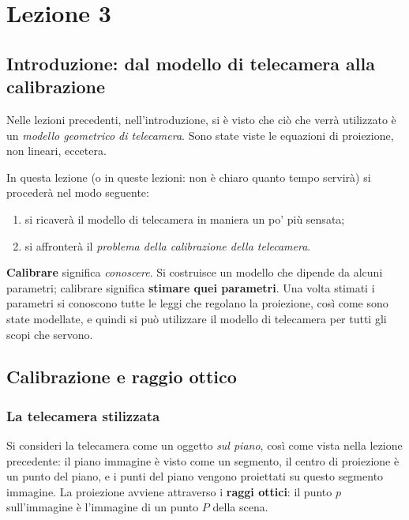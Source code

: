 
\chapter{Lezione 3}

\section{Introduzione: dal modello di telecamera alla calibrazione}

Nelle lezioni precedenti, nell'introduzione, si è visto che ciò che verrà utilizzato è un \emph{modello geometrico di telecamera}. Sono state viste le equazioni di proiezione, non lineari, eccetera.

In questa lezione (o in queste lezioni: non è chiaro quanto tempo servirà) si procederà nel modo seguente:
\begin{enumerate}[label=\arabic*.]
  \item si ricaverà il modello di telecamera in maniera un po' più sensata;
  \item si affronterà il \emph{problema della calibrazione della telecamera}.
\end{enumerate}

\textbf{Calibrare} significa \emph{conoscere}. Si costruisce un modello che dipende da alcuni parametri; calibrare significa \textbf{stimare quei parametri}. Una volta stimati i parametri si conoscono tutte le leggi che regolano la proiezione, così come sono state modellate, e quindi si può utilizzare il modello di telecamera per tutti gli scopi che servono.

\section{Calibrazione e raggio ottico}

\subsection{La telecamera stilizzata}

Si consideri la telecamera come un oggetto \emph{sul piano}, così come vista nella lezione precedente: il piano immagine è visto come un segmento, il centro di proiezione è un punto del piano, e i punti del piano vengono proiettati su questo segmento immagine. La proiezione avviene attraverso i \textbf{raggi ottici}: il punto $p$ sull'immagine è l'immagine di un punto $P$ della scena.

